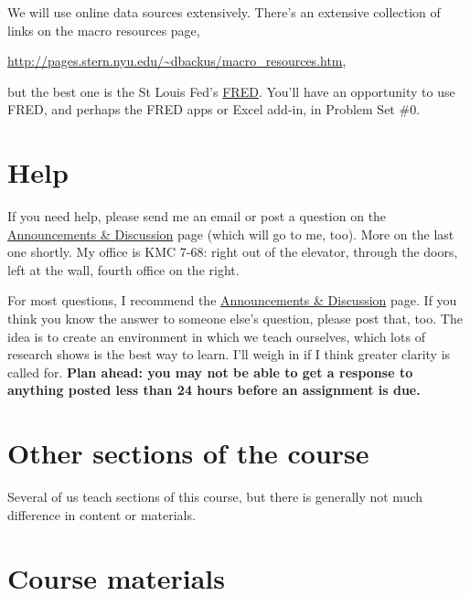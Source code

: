 \documentclass[12pt]{article}
\begin{document}
We will use online data sources extensively.
There's an extensive collection of links on the macro resources page,

\vspace*{\parskip}
\centerline{\url{http://pages.stern.nyu.edu/~dbackus/macro_resources.htm},}

but the best one is the St Louis Fed's
\href{http://research.stlouisfed.org/fred2/}{FRED}.
You'll have an opportunity to use FRED, and perhaps the FRED apps or Excel add-in,
in Problem Set \#0.



\section{Help}

If you need help, please send me an email or post a question
on the
\href{https://sites.google.com/site/nyusternglobal/home/announcements}{Announcements \& Discussion}
page (which will go to me, too).
More on the last one shortly.
My office is KMC 7-68:
right out of the elevator, through the doors, left at the wall, fourth office on the right.

For most questions, I recommend the
\href{https://sites.google.com/site/nyusternglobal/home/announcements}{Announcements \& Discussion}
page.
If you think you know the answer to someone else's question, please post that, too.
The idea is to create an environment in which we teach ourselves,
which lots of research shows is the best way to learn.
I'll weigh in if I think greater clarity is called for.
{\bf Plan ahead:  you may not be able to get a response to anything posted
less than 24 hours before an assignment is due.}

\section{Other sections of the course}

Several of us teach sections of this course,
but there is generally not much difference in content or materials.


\section{Course materials}
\end{document}

